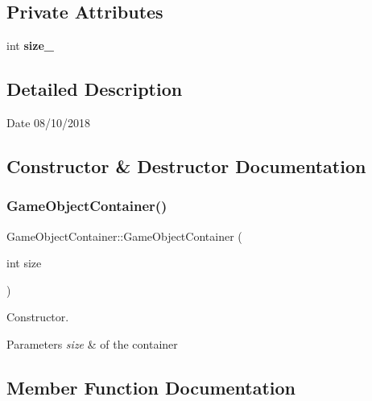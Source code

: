 \subsection*{Private Attributes}
\begin{DoxyCompactItemize}
\item 
\mbox{\label{class_game_object_container_a49c7e858bdedb0c05cbab00d0a0bd46f}} 
int {\bfseries size\+\_\+}
\end{DoxyCompactItemize}


\subsection{Detailed Description}
\begin{DoxyDate}{Date}
08/10/2018 
\end{DoxyDate}


\subsection{Constructor \& Destructor Documentation}
\mbox{\label{class_game_object_container_ad3b33550acd14414d6434e6836885f3c}} 
\subsubsection{\texorpdfstring{Game\+Object\+Container()}{GameObjectContainer()}}
{\footnotesize\ttfamily Game\+Object\+Container\+::\+Game\+Object\+Container (\begin{DoxyParamCaption}\item[{int}]{size }\end{DoxyParamCaption})\hspace{0.3cm}{\ttfamily [inline]}}



Constructor. 


\begin{DoxyParams}{Parameters}
{\em size} & of the container \\
\hline
\end{DoxyParams}


\subsection{Member Function Documentation}
\mbox{\label{class_game_object_container_affa50b43ca7b82d54055b6499e024aba}} 
